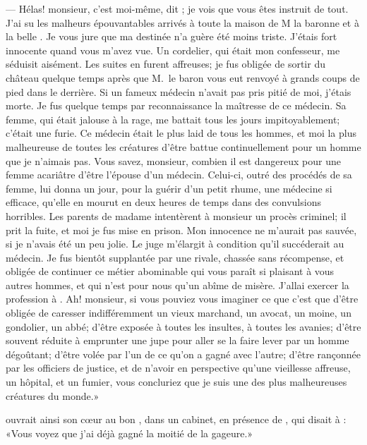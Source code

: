 — Hélas! monsieur, c’est moi-même, dit ; je vois que vous êtes
instruit de tout. J’ai su les malheurs 
épouvantables
 arrivés à toute la
maison de M la baronne et à la belle . Je vous jure que
ma destinée n’a guère été moins triste. J’étais fort innocente quand
vous m’avez vue. Un cordelier, qui était mon confesseur, me séduisit
aisément. Les suites en furent affreuses; je fus obligée de sortir du
château quelque temps après que M.~le baron vous eut renvoyé à grands
coups de pied dans le derrière. Si un fameux médecin n’avait pas pris
pitié de moi, j’étais morte. Je fus quelque temps par reconnaissance la
maîtresse de ce médecin. Sa femme, qui était jalouse à la rage, me
battait tous les jours impitoyablement; c’était une furie. Ce médecin
était le plus laid de tous les hommes, et moi la plus malheureuse de
toutes les créatures d’être battue continuellement pour un homme que je
n’aimais pas. Vous savez, monsieur, combien il est dangereux pour une
femme acariâtre d’être l’épouse d’un médecin. Celui-ci, outré des
procédés de sa femme, lui donna un jour, pour la guérir d’un petit
rhume, une médecine si efficace, qu’elle en mourut en deux heures de
temps dans des convulsions horribles. Les parents de madame intentèrent
à monsieur un procès criminel; il prit la fuite, et moi je fus mise en
prison. Mon innocence ne m’aurait pas sauvée, si je n’avais été un peu
jolie. Le juge m’élargit à condition qu’il succéderait au médecin. Je
fus bientôt supplantée par une rivale, chassée sans récompense, et
obligée de continuer ce métier abominable qui vous paraît si plaisant à
vous autres hommes, et qui n’est pour nous qu’un abîme de misère.
J’allai exercer la profession à  . Ah! monsieur, si vous pouviez
vous imaginer ce que c’est que d’être obligée de caresser
indifféremment un vieux marchand, un avocat, un moine, un gondolier, un
abbé; d’être exposée à toutes les insultes, à toutes les avanies;
d’être souvent réduite à emprunter une jupe pour aller se la faire
lever par un homme dégoûtant; d’être volée par l’un de ce qu’on a gagné
avec l’autre; d’être rançonnée par les officiers de justice, et de
n’avoir en perspective qu’une vieillesse affreuse, un hôpital, et un
fumier, vous concluriez que je suis une des plus malheureuses créatures
du monde.»

 ouvrait ainsi son cœur au bon , dans un cabinet, en
présence de , qui disait à : «Vous voyez que j’ai déjà
gagné la moitié de la gageure.»


